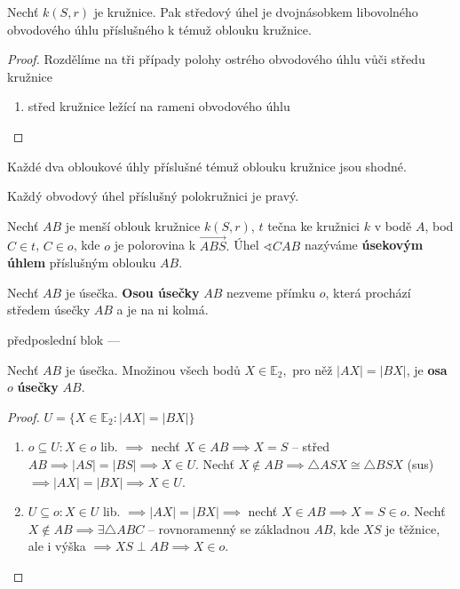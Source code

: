 \begin{veta}
  Nechť $k(S,r)$ je kružnice. Pak středový úhel je dvojnásobkem libovolného obvodového úhlu příslušného k témuž oblouku kružnice.
\end{veta}


\begin{proof}
  Rozdělíme na tři případy polohy ostrého obvodového úhlu vůči středu kružnice
  \begin{enumerate}
    \item střed kružnice ležící na rameni obvodového úhlu
  \end{enumerate}
\end{proof}


\begin{veta}
  Každé dva obloukové úhly příslušné témuž oblouku kružnice jsou shodné.
\end{veta}


\begin{veta}[Thaletova]
  Každý obvodový úhel příslušný polokružnici je pravý.
\end{veta}

\begin{definition}
  Nechť $AB$ je menší oblouk kružnice $k(S,r)$, $t$ tečna ke kružnici $k$ v bodě $A$, bod $C\in t$, $C\in o$, kde $o$ je polorovina k $\overrightarrow{ABS}.$ Úhel $\sphericalangle CAB$ nazýváme \textbf{úsekovým úhlem} příslušným oblouku $AB$.
\end{definition}


\begin{definition}
  Nechť $AB$ je úsečka. \textbf{Osou úsečky} $AB$ nezveme přímku $o$, která prochází středem úsečky $AB$ a je na ni kolmá.
\end{definition}


předposlední blok ---
\begin{veta}\label{mbdv}
  Nechť $AB$ je úsečka. Množinou všech bodů $X\in \mathbb E_2,$ pro něž $|AX|=|BX|$, je \textbf{osa} $o$ \textbf{úsečky} $AB$.
\end{veta}

\begin{proof}
  $U=\{ X\in \mathbb E_2: |AX|=|BX| \}$
  \begin{enumerate}[$i.$]
    \item $o \subseteq U: X \in o$ lib. $\implies$ nechť $X\in AB \implies X=S$ -- střed $AB \implies |AS|=|BS| \implies X \in U.$ Nechť $X \notin AB \implies \triangle ASX \cong \triangle BSX$ (sus) $\implies |AX|=|BX| \implies X \in U$.
    \item $U \subseteq o: X \in U$ lib. $\implies |AX|=|BX| \implies$ nechť $X \in AB \implies X=S \in o.$ Nechť $X \notin AB \implies \exists \triangle ABC$ -- rovnoramenný se základnou $AB$, kde $XS$ je těžnice, ale i výška $\implies XS \perp AB \implies X \in o.$ \qedhere
  \end{enumerate}
\end{proof}

